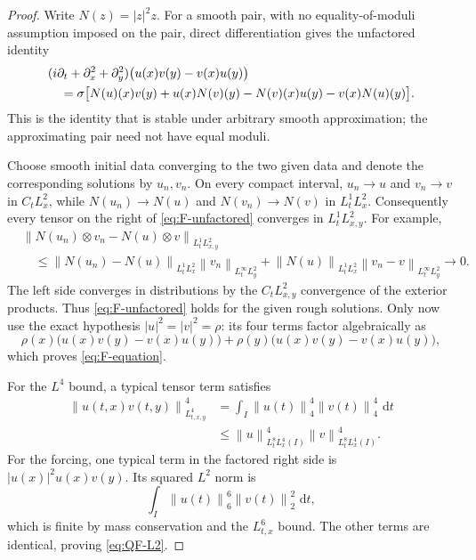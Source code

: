 \documentclass[11pt,oneside]{book}
\theoremstyle{definition}
\theoremstyle{remark}
\newcommand{\1}{\mathbf 1}
\newcommand{\dd}{\,\mathrm d}
\newcommand{\norm}[1]{\left\lVert #1\right\rVert}
\begin{document}
\begin{proof}
Write $N(z)=|z|^2z$.  For a smooth pair, with no equality-of-moduli
assumption imposed on the pair, direct differentiation gives the unfactored
identity
\begin{align}
 &(i\partial_t+\partial_x^2+\partial_y^2)
   \bigl(u(x)v(y)-v(x)u(y)\bigr) \notag\\
 &\quad=\sigma\bigl[
   N(u)(x)v(y)+u(x)N(v)(y)
  -N(v)(x)u(y)-v(x)N(u)(y)\bigr].                 \label{eq:F-unfactored}
\end{align}
This is the identity that is stable under arbitrary smooth approximation;
the approximating pair need not have equal moduli.

Choose smooth initial data converging to the two given data and denote the
corresponding solutions by $u_n,v_n$.  On every compact interval,
$u_n\to u$ and $v_n\to v$ in $C_tL^2_x$, while
$N(u_n)\to N(u)$ and $N(v_n)\to N(v)$ in $L^1_tL^2_x$.
Consequently every tensor on the right of \eqref{eq:F-unfactored} converges
in $L^1_tL^2_{x,y}$.  For example,
\begin{align*}
 &\norm{N(u_n)\otimes v_n-N(u)\otimes v}_{L^1_tL^2_{x,y}}\\
 &\quad\le
   \norm{N(u_n)-N(u)}_{L^1_tL^2_x}
   \norm{v_n}_{L^\infty_tL^2_y}
  +\norm{N(u)}_{L^1_tL^2_x}
   \norm{v_n-v}_{L^\infty_tL^2_y}\longrightarrow0.
\end{align*}
The left side converges in distributions by the $C_tL^2_{x,y}$ convergence
of the exterior products.  Thus \eqref{eq:F-unfactored} holds for the given
rough solutions.  Only now use the exact hypothesis
$|u|^2=|v|^2=\rho$: its four terms factor algebraically as
\[
 \rho(x)\bigl(u(x)v(y)-v(x)u(y)\bigr)
 +\rho(y)\bigl(u(x)v(y)-v(x)u(y)\bigr),
\]
which proves \eqref{eq:F-equation}.

For the $L^4$ bound, a typical tensor term satisfies
\begin{align*}
 \norm{u(t,x)v(t,y)}_{L^4_{t,x,y}}^4
 &=\int_I\norm{u(t)}_4^4\norm{v(t)}_4^4\,\dd t\\
 &\le\norm u_{L^8_tL^4_x(I)}^4
       \norm v_{L^8_tL^4_x(I)}^4.
\end{align*}
For the forcing, one typical term in the factored right side is
$|u(x)|^2u(x)v(y)$.  Its squared $L^2$ norm is
\[
 \int_I\norm{u(t)}_6^6\norm{v(t)}_2^2\,\dd t,
\]
which is finite by mass conservation and the $L^6_{t,x}$ bound.  The other
terms are identical, proving \eqref{eq:QF-L2}.
\end{proof}
\end{document}
